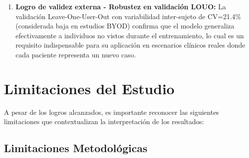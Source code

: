 \begin{enumerate}
    \item \textbf{Logro de validez externa - Robustez en validación LOUO:} La validación Leave-One-User-Out con variabilidad inter-sujeto de CV=21.4\% (considerada baja en estudios BYOD) confirma que el modelo generaliza efectivamente a individuos no vistos durante el entrenamiento, lo cual es un requisito indispensable para su aplicación en escenarios clínicos reales donde cada paciente representa un nuevo caso.
\end{enumerate}


\section{Limitaciones del Estudio}
\label{sec:limitaciones}

A pesar de los logros alcanzados, es importante reconocer las siguientes limitaciones que contextualizan la interpretación de los resultados:

\subsection{Limitaciones Metodológicas}
\label{subsec:limitaciones_metodologicas}

